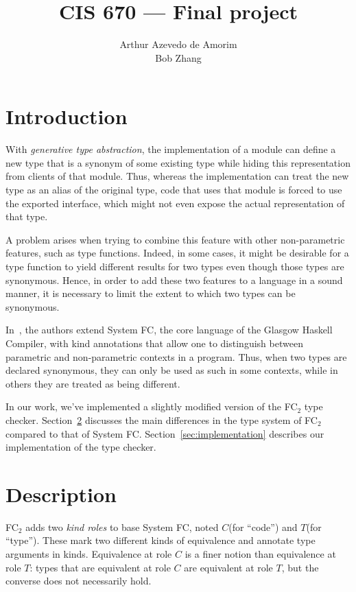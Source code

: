 \documentclass{article}
\title{CIS 670 --- Final project}
\author{Arthur Azevedo de Amorim \\ Bob Zhang}
\newcommand{\fct}{FC\(_2\)\xspace}
\newcommand{\kindc}{\(C\)\xspace}
\newcommand{\kindt}{\(T\)\xspace}
\begin{document}
\maketitle

\section{Introduction}

With \emph{generative type abstraction}, the implementation of a
module can define a new type that is a synonym of some existing type
while hiding this representation from clients of that module. Thus,
whereas the implementation can treat the new type as an alias of the
original type, code that uses that module is forced to use the
exported interface, which might not even expose the actual
representation of that type.

A problem arises when trying to combine this feature with other
non-parametric features, such as type functions. Indeed, in some
cases, it might be desirable for a type function to yield different
results for two types even though those types are synonymous. Hence,
in order to add these two features to a language in a sound manner, it
is necessary to limit the extent to which two types can be synonymous.

In~\cite{newtypes}, the authors extend System FC, the core language of
the Glasgow Haskell Compiler, with kind annotations that allow one to
distinguish between parametric and non-parametric contexts in a
program. Thus, when two types are declared synonymous, they can only
be used as such in some contexts, while in others they are treated as
being different.

In our work, we've implemented a slightly modified version of the \fct
type checker. Section~\ref{sec:description} discusses the main
differences in the type system of \fct compared to that of System
FC. Section~\ref{sec:implementation} describes our implementation of
the type checker.

\section{Description}

\label{sec:description}

\fct adds two \emph{kind roles} to base System FC, noted \kindc (for
``code'') and \kindt (for ``type''). These mark two different kinds of
equivalence and annotate type arguments in kinds. Equivalence at role
\kindc is a finer notion than equivalence at role \kindt: types that
are equivalent at role \kindc are equivalent at role \kindt, but the
converse does not necessarily hold.
\end{document}
